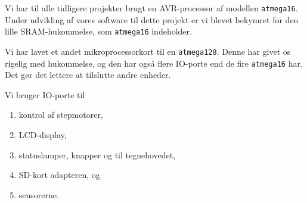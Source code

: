 Vi har til alle tidligere projekter brugt en AVR-processor af modellen
\texttt{atmega16}. Under udvikling af vores software til dette projekt
er vi blevet bekymret for den lille SRAM-hukommelse, som
\texttt{atmega16} indeholder.

Vi har lavet et andet mikroprocessorkort til en
\texttt{atmega128}. Denne har givet os rigelig med hukommelse, og den
har også flere IO-porte end de fire \texttt{atmega16} har. Det gør det
lettere at tilslutte andre enheder.

Vi bruger IO-porte til
\begin{enumerate} \firmlist
\item{kontrol af stepmotorer,}
\item{LCD-display,}
\item{statuslamper, knapper og til tegnehovedet,}
\item{SD-kort adapteren, og}
\item{sensorerne.}
\end{enumerate}


